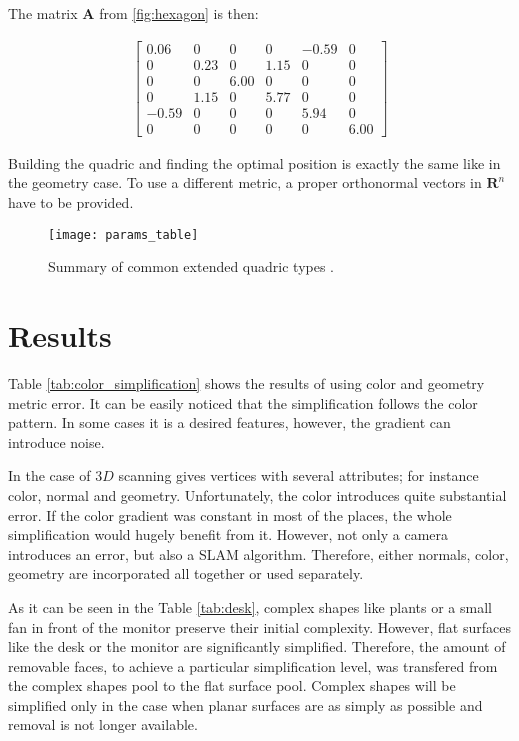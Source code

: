 The matrix $\mathbf{A}$ from \ref{fig:hexagon} is then:

\begin{align}
\left[
\begin{array}{rrrrrr}
0.06 & 0 & 0 & 0 & -0.59 & 0\\
0 & 0.23 & 0 & 1.15 & 0 & 0\\
0 & 0 & 6.00 & 0 & 0 & 0\\
0 & 1.15 & 0 & 5.77 & 0 & 0\\
-0.59 & 0 & 0 & 0 & 5.94 & 0\\
0 & 0 & 0 & 0 & 0 & 6.00
\end{array}\right]
\end{align}

Building the quadric and finding the optimal position is exactly the same like in the geometry case. To use a different metric, a proper orthonormal vectors in $\mathbf{R}^n$ have to be provided.

\begin{figure}[H]
  \begin{center}
    \texttt{[image: params\_table]}
    \caption{Summary of common extended quadric types \cite{garland99}.}
    \label{fig:params_table}
  \end{center}
\end{figure}

\section{Results}

Table \ref{tab:color_simplification} shows the results of using color and geometry metric error. It can be easily noticed that the simplification follows the color pattern. In some cases it is a desired features, however, the gradient can introduce noise.

In the case of $3D$ scanning gives vertices with several attributes; for instance color, normal and geometry. Unfortunately, the color introduces quite substantial error. If the color gradient was constant in most of the places, the whole simplification would hugely benefit from it. However, not only a camera introduces an error, but also a SLAM algorithm. Therefore, either normals, color, geometry are incorporated all together or used separately.

As it can be seen in the Table \ref{tab:desk}, complex shapes like plants or a small fan in front of the monitor preserve their initial complexity. However, flat surfaces like the desk or the monitor are significantly simplified. Therefore, the amount of removable faces, to achieve a particular simplification level, was transfered from the complex shapes pool to the flat surface pool. Complex shapes will be simplified only in the case when planar surfaces are as simply as possible and removal is not longer available.

